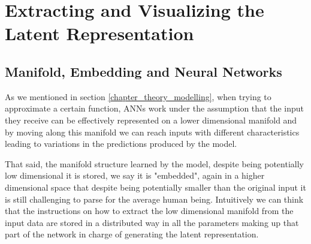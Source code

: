 \section{Extracting and Visualizing the Latent Representation}
\label{extract_visulize}

\subsection{Manifold, Embedding and Neural Networks}
\label{manifold_learning_embed}
As we mentioned in section \ref{chapter_theory_modelling}, when trying to approximate a certain function, ANNs work under the assumption that the input they receive can be effectively represented on a lower dimensional manifold and by moving along this manifold we can reach inputs with different characteristics leading to variations in the predictions produced by the model. 

That said, the manifold structure learned by the model, despite being potentially low dimensional it is stored, we say it is "embedded", again in a higher dimensional space \cite{bengio2017deep} that despite being potentially smaller than the original input it is still challenging to parse for the average human being. Intuitively we can think that the instructions on how to extract the low dimensional manifold from the input data are stored in a distributed way in all the parameters making up that part of the network in charge of generating the latent representation. 

